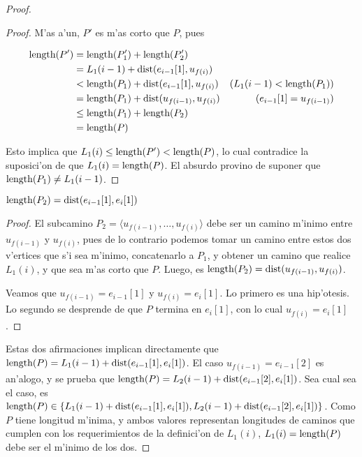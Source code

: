 \begin{theorem}
\begin{proof}
\begin{claim}
\begin{proof}
M'as a'un, $P'$ es m'as corto que $P$, pues

\begin{align*}
\textnormal{length}(P') &= \textnormal{length}(P_1') + \textnormal{length}(P_2') &\\
&= L_1(i - 1) + \textnormal{dist}(e_{i - 1}[1], u_{f(i)}) &\\
&< \textnormal{length}(P_1) + \textnormal{dist}(e_{i - 1}[1], u_{f(i)}) & \text{(} L_1(i - 1) < \textnormal{length}(P_1) \text{)}\\
&= \textnormal{length}(P_1) + \textnormal{dist}(u_{f(i - 1)}, u_{f(i)}) & \text{(} e_{i - 1}[1] = u_{f(i - 1)} \text{)}\\
&\leq \textnormal{length}(P_1) + \textnormal{length}(P_2)\\
&= \textnormal{length}(P)
\end{align*}

\noindent
Esto implica que $L_1(i) \leq \textnormal{length}(P') < \textnormal{length}(P)$, lo cual contradice la suposici'on de que $L_1(i) = \textnormal{length}(P)$. El absurdo provino de suponer que $\textnormal{length}(P_1) \neq L_1(i - 1)$.
\end{proof}
\end{claim}

\begin{claim}
$\textnormal{length}(P_2) = \textnormal{dist}(e_{i - 1}[1], e_{i}[1])$

\begin{proof}
El subcamino $P_2 = \langle u_{f(i - 1)}, \dots, u_{f(i)} \rangle$ debe ser un camino m'inimo entre $u_{f(i - 1)}$ y $u_{f(i)}$, pues de lo contrario podemos tomar un camino entre estos dos v'ertices que s'i sea m'inimo, concatenarlo a $P_1$, y obtener un camino que realice $L_1(i)$, y que sea m'as corto que $P$. Luego, es $\textnormal{length}(P_2) = \textnormal{dist}(u_{f(i - 1)}, u_{f(i)})$.

Veamos que $u_{f(i - 1)} = e_{i - 1}[1]$ y $u_{f(i)} = e_{i}[1]$. Lo primero es una hip'otesis. Lo segundo se desprende de que $P$ termina en $e_{i}[1]$, con lo cual $u_{f(i)} = e_{i}[1]$.
\end{proof}
\end{claim}

Estas dos afirmaciones implican directamente que $\textnormal{length}(P) = L_1(i - 1) + \textnormal{dist}(e_{i - 1}[1], e_{i}[1])$. El caso $u_{f(i - 1)} = e_{i - 1}[2]$ es an'alogo, y se prueba que $\textnormal{length}(P) = L_2(i - 1) + \textnormal{dist}(e_{i - 1}[2], e_{i}[1])$. Sea cual sea el caso, es $\textnormal{length}(P) \in \{L_1(i - 1) + \textnormal{dist}(e_{i - 1}[1], e_{i}[1]), L_2(i - 1) + \textnormal{dist}(e_{i - 1}[2], e_{i}[1])\}$. Como $P$ tiene longitud m'inima, y ambos valores representan longitudes de caminos que cumplen con los requerimientos de la definici'on de $L_1(i)$, $L_1(i) = \textnormal{length}(P)$ debe ser el m'inimo de los dos.
\end{proof}
\end{theorem}

